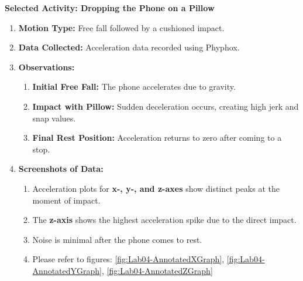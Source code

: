 \documentclass[idxtotoc,hyperref,openany]{labbook} %
\begin{document}

\textbf{Selected Activity: Dropping the Phone on a Pillow}
\begin{enumerate}[$\bullet$]
    \item \textbf{Motion Type:} Free fall followed by a cushioned impact.
    \item \textbf{Data Collected:} Acceleration data recorded using Phyphox.
    \item \textbf{Observations:}
    \begin{enumerate}[$\bullet$]
        \item \textbf{Initial Free Fall:} The phone accelerates due to gravity.
        \item \textbf{Impact with Pillow:} Sudden deceleration occurs, creating high jerk and snap values.
        \item \textbf{Final Rest Position:} Acceleration returns to zero after coming to a stop.
    \end{enumerate}
    \item \textbf{Screenshots of Data:}
    \begin{enumerate}[$\bullet$]
        \item Acceleration plots for \textbf{x-, y-, and z-axes} show distinct peaks at the moment of impact.
        \item The \textbf{z-axis} shows the highest acceleration spike due to the direct impact.
        \item Noise is minimal after the phone comes to rest.
        \item Please refer to figures: \ref{fig:Lab04-AnnotatedXGraph}, \ref{fig:Lab04-AnnotatedYGraph}, \ref{fig:Lab04-AnnotatedZGraph}
    \end{enumerate}
\end{enumerate}

\end{document}

